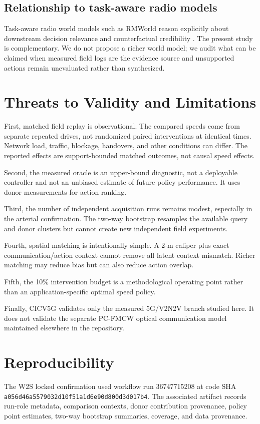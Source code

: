 \documentclass[journal]{IEEEtran}
\begin{document}
\subsection{Relationship to task-aware radio models}
Task-aware radio world models such as RMWorld reason explicitly about downstream decision relevance and counterfactual credibility \cite{wang2026rmworld}. The present study is complementary. We do not propose a richer world model; we audit what can be claimed when measured field logs are the evidence source and unsupported actions remain unevaluated rather than synthesized.

\section{Threats to Validity and Limitations}
First, matched field replay is observational. The compared speeds come from separate repeated drives, not randomized paired interventions at identical times. Network load, traffic, blockage, handovers, and other conditions can differ. The reported effects are support-bounded matched outcomes, not causal speed effects.

Second, the measured oracle is an upper-bound diagnostic, not a deployable controller and not an unbiased estimate of future policy performance. It uses donor measurements for action ranking.

Third, the number of independent acquisition runs remains modest, especially in the arterial confirmation. The two-way bootstrap resamples the available query and donor clusters but cannot create new independent field experiments.

Fourth, spatial matching is intentionally simple. A 2-m caliper plus exact communication/action context cannot remove all latent context mismatch. Richer matching may reduce bias but can also reduce action overlap.

Fifth, the 10\% intervention budget is a methodological operating point rather than an application-specific optimal speed policy.

Finally, CICV5G validates only the measured 5G/V2N2V branch studied here. It does not validate the separate PC-FMCW optical communication model maintained elsewhere in the repository.

\section{Reproducibility}
The W2S locked confirmation used workflow run 36747715208 at code SHA
\texttt{a056d46a5579032d10f51a1d6e90d800d3d017b4}. The associated artifact records run-role metadata, comparison contexts, donor contribution provenance, policy point estimates, two-way bootstrap summaries, coverage, and data provenance.
\end{document}
